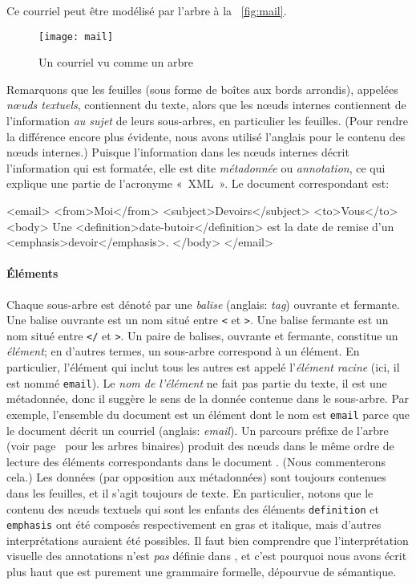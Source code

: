 \bigskip

\noindent Ce courriel peut être modélisé par l'arbre à la
\fig~\vref{fig:mail}.
\begin{figure}[b]
\begin{center}
\texttt{[image: mail]}
\caption{Un courriel vu comme un arbre \XML}
\label{fig:mail}
\end{center}
\end{figure}
Remarquons que les feuilles (sous forme de boîtes aux bords arrondis),
appelées \emph{nœuds textuels}, contiennent du texte, alors que
les nœuds internes contiennent de l'information \emph{au sujet} de
leurs sous-arbres, en particulier les feuilles. (Pour rendre la
différence encore plus évidente, nous avons utilisé l'anglais pour le
contenu des nœuds internes.) Puisque l'information dans les
nœuds internes décrit l'information qui est formatée, elle est
dite \emph{métadonnée} ou \emph{annotation}, ce qui explique une
partie de l'acronyme «~\textsf{XML}~». Le document \XML correspondant
est:
\begin{sverb}
<email>
  <from>Moi</from>
  <subject>Devoirs</subject>
  <to>Vous</to>
  <body>
  Une <definition>date-butoir</definition> est la date de remise
d'un <emphasis>devoir</emphasis>.
  </body>
</email>
\end{sverb}

\paragraph{Éléments}

Chaque sous-arbre est dénoté par une \emph{balise} (anglais:
\emph{tag}) ouvrante et fermante. Une balise ouvrante est un nom situé
entre \texttt{<} et \texttt{>}. Une balise fermante est un nom situé
entre \texttt{</} et \texttt{>}. Un paire de balises, ouvrante et
fermante, constitue un \emph{élément}; en d'autres termes, un
sous-arbre correspond à un élément. En particulier, l'élément qui
inclut tous les autres est appelé l'\emph{élément racine} (ici, il est
nommé \texttt{email}). Le \emph{nom de l'élément} ne fait pas partie
du texte, il est une métadonnée, donc il suggère le sens de la donnée
contenue dans le sous-arbre. Par exemple, l'ensemble du document \XML
est un élément dont le nom est \texttt{email} parce que le document
décrit un courriel (anglais: \emph{email}). Un parcours préfixe de
l'arbre \XML (voir page~\pageref{preorder} pour les arbres binaires)
produit des nœuds dans le même ordre de lecture des éléments
correspondants dans le document \XML. (Nous commenterons cela.) Les
données (par opposition aux métadonnées) sont toujours contenues dans
les feuilles, et il s'agit toujours de texte. En particulier, notons
que le contenu des nœuds textuels qui sont les enfants des
éléments \texttt{definition} et \texttt{emphasis} ont été composés
respectivement en gras et italique, mais d'autres interprétations
auraient été possibles. Il faut bien comprendre que l'interprétation
visuelle des annotations n'est \emph{pas} définie dans \XML, et c'est
pourquoi nous avons écrit plus haut que \XML est purement une
grammaire formelle, dépourvue de sémantique.

